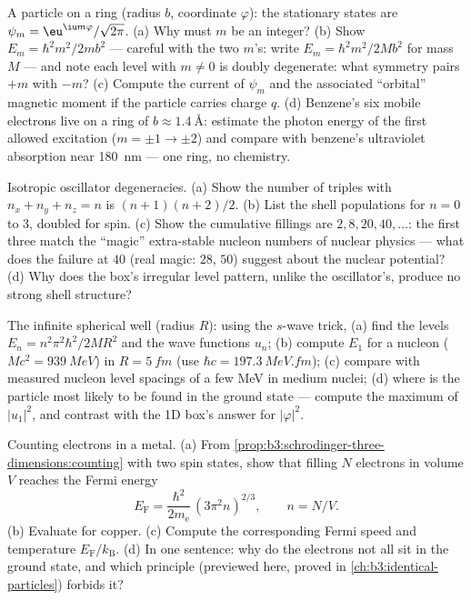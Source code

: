 \begin{exercise}[$\star\star$]\label{exo:b3:schrodinger-three-dimensions:5}
A particle on a ring (radius $b$, coordinate $\varphi$): the
stationary states are $\psi_m = \eu^{\iu m\varphi}/\sqrt{2\pi}$. (a)
Why must $m$ be an integer? (b) Show $E_m = \hbar^2m^2/2mb^2$ ---
careful with the two $m$'s: write $E_m = \hbar^2 m^2/2Mb^2$ for mass
$M$ --- and note each level with $m \neq 0$ is doubly degenerate:
what symmetry pairs $+m$ with $-m$? (c) Compute the current of
$\psi_m$ and the associated ``orbital'' magnetic moment if the
particle carries charge $q$. (d) Benzene's six mobile electrons live
on a ring of $b \approx \qty{1.4}{\angstrom}$: estimate the photon
energy of the first allowed excitation ($m = \pm1 \to \pm2$) and
compare with benzene's ultraviolet absorption near \qty{180}{nm} ---
one ring, no chemistry.
\end{exercise}

\begin{exercise}[$\star\star$]\label{exo:b3:schrodinger-three-dimensions:6}
Isotropic oscillator degeneracies. (a) Show the number of triples
with $n_x + n_y + n_z = n$ is $(n+1)(n+2)/2$. (b) List the shell
populations for $n = 0$ to $3$, doubled for spin. (c) Show the
cumulative fillings are $2, 8, 20, 40, \dots$: the first three match
the ``magic'' extra-stable nucleon numbers of nuclear physics ---
what does the failure at $40$ (real magic: $28$, $50$) suggest about
the nuclear potential? (d) Why does the box's irregular level
pattern, unlike the oscillator's, produce no strong shell structure?
\end{exercise}

\begin{exercise}[$\star\star$]\label{exo:b3:schrodinger-three-dimensions:7}
The infinite spherical well (radius $R$): using the $s$-wave trick,
(a) find the levels $E_n = n^2\pi^2\hbar^2/2MR^2$ and the wave
functions $u_n$; (b) compute $E_1$ for a nucleon ($Mc^2 =
\qty{939}{MeV}$) in $R = \qty{5}{fm}$ (use $\hbar c =
\qty{197.3}{MeV.fm}$); (c) compare with measured nucleon level
spacings of a few MeV in medium nuclei; (d) where is the particle
most likely to be found in the ground state --- compute the maximum
of $|u_1|^2$, and contrast with the 1D box's answer for $|\varphi|^2$.
\end{exercise}

\begin{exercise}[$\star\star$]\label{exo:b3:schrodinger-three-dimensions:8}
Counting electrons in a metal. (a) From
\cref{prop:b3:schrodinger-three-dimensions:counting} with two spin
states, show that filling $N$ electrons in volume $V$ reaches the
Fermi energy
\[
E_{\text{F}} = \frac{\hbar^2}{2m_{\text{e}}}\,(3\pi^2n)^{2/3} ,
\qquad n = N/V .
\]
(b) Evaluate for copper. (c) Compute the corresponding Fermi speed
and temperature $E_{\text{F}}/k_{\text{B}}$. (d) In one sentence:
why do the electrons not all sit in the ground state, and which
principle (previewed here, proved in
\cref{ch:b3:identical-particles}) forbids it?
\end{exercise}

